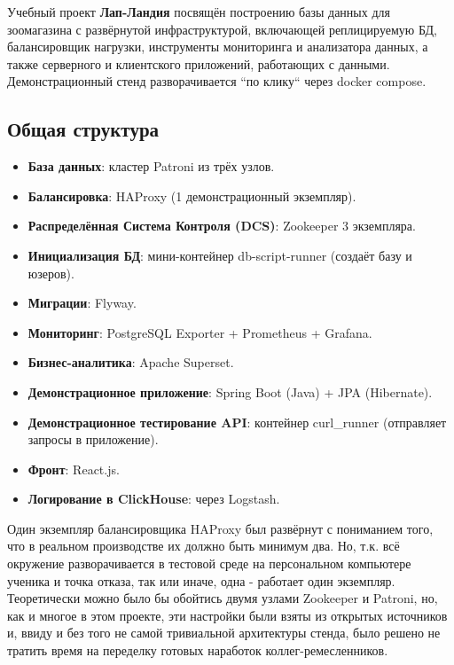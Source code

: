 Учебный проект \textbf{Лап-Ландия} посвящён построению базы данных для зоомагазина с развёрнутой инфраструктурой,
включающей реплицируемую БД, балансировщик нагрузки,
инструменты мониторинга и анализатора данных, а также
серверного и клиентского приложений, работающих с данными.
Демонстрационный стенд разворачивается ``по клику`` через docker compose.

\subsection{Общая структура}\label{subsec:-generalstructure:-}

\begin{itemize}
    \item \textbf{База данных}: кластер Patroni из трёх узлов.
    \item \textbf{Балансировка}: HAProxy (1 демонстрационный экземпляр).
    \item \textbf{Распределённая Система Контроля (DCS)}: Zookeeper 3 экземпляра.
    \item \textbf{Инициализация БД}: мини-контейнер db-script-runner (создаёт базу и юзеров).
    \item \textbf{Миграции}: Flyway.
    \item \textbf{Мониторинг}: PostgreSQL Exporter + Prometheus + Grafana.
    \item \textbf{Бизнес-аналитика}: Apache Superset.
    \item \textbf{Демонстрационное приложение}: Spring Boot (Java) + JPA (Hibernate).
    \item \textbf{Демонстрационное тестирование API}: контейнер curl\_runner (отправляет запросы в приложение).
    \item \textbf{Фронт}: React.js.
    \item \textbf{Логирование в ClickHouse}: через Logstash.
\end{itemize}

Один экземпляр балансировщика HAProxy был развёрнут с пониманием того, что в реальном производстве их должно быть
минимум два.
Но, т.к. всё окружение разворачивается в тестовой среде на персональном компьютере ученика и точка отказа, так или
иначе, одна - работает один экземпляр.
Теоретически можно было бы обойтись двумя узлами Zookeeper и Patroni, но, как и многое в этом проекте, эти настройки
были взяты из открытых источников и, ввиду и без того не самой тривиальной архитектуры стенда, было решено
не тратить время на переделку готовых наработок коллег-ремесленников.

